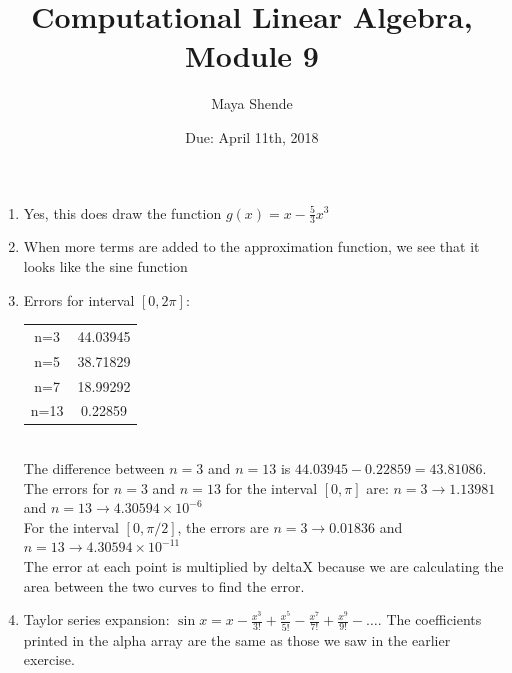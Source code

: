 \documentclass{article}
\title{Computational Linear Algebra, Module 9}
\author{Maya Shende}
\date{Due: April 11th, 2018}
\begin{document}
\maketitle

\begin{enumerate}

\item Yes, this does draw the function $g(x) = x-\frac{5}{3}x^3$

\item When more terms are added to the approximation function, we see that it looks like the sine function

\item 
Errors for interval $[0, 2\pi]:$\\
\begin{tabular}{|c|c|}
	\hline
	n=3	&44.03945\\
	n=5 	&38.71829\\
	n=7	&18.99292\\
	n=13	&0.22859\\	
	\hline
\end{tabular}\\
The difference between $n=3$ and $n=13$ is $44.03945-0.22859 = 43.81086$. The errors for $n=3$ and $n=13$ for the interval $[0,\pi]$ are: $n=3 \rightarrow 1.13981$ and $n=13 \rightarrow 4.30594 \times 10^{-6}$\\

For the interval $[0, \pi/2]$, the errors are $n=3 \rightarrow 0.01836$ and $n=13 \rightarrow 4.30594 \times 10^{-11}$\\

The error at each point is multiplied by deltaX because we are calculating the area between the two curves to find the error. 

\item Taylor series expansion: $\sin{x} = x - \frac{x^3}{3!} + \frac{x^5}{5!} - \frac{x^7}{7!} + \frac{x^9}{9!} - \dots$. The coefficients printed in the alpha array are the same as those we saw in the earlier exercise. 


\end{enumerate}
\end{document}
